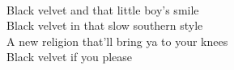 \\
	Black velvet and that little boy's smile \\
	Black velvet in that slow southern style \\
	A new religion that'll bring ya to your knees \\
	Black velvet if you please \\


